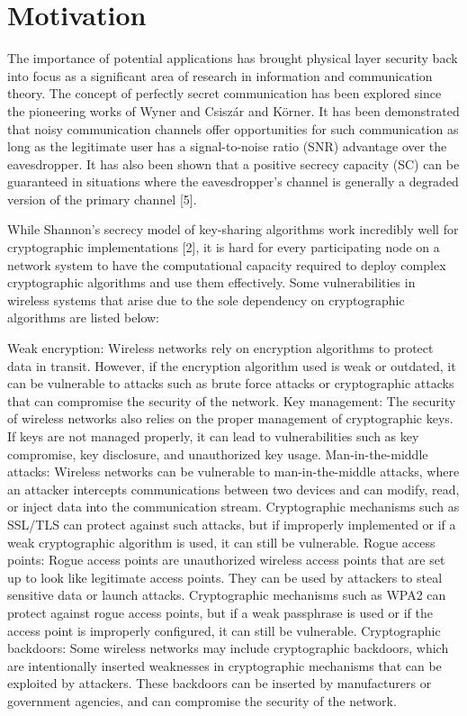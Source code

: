 \documentclass[conference]{IEEEtran}
\begin{document}
\section{Motivation}


The importance of potential applications has brought physical layer security back into focus as a significant area of research in information and communication theory. The concept of perfectly secret communication has been explored since the pioneering works of Wyner and Csiszár and Körner. It has been demonstrated that noisy communication channels offer opportunities for such communication as long as the legitimate user has a signal-to-noise ratio (SNR) advantage over the eavesdropper. It has also been shown that a positive secrecy capacity (SC) can be guaranteed in situations where the eavesdropper's channel is generally a degraded version of the primary channel [5].

While Shannon’s secrecy model of key-sharing algorithms work incredibly well for cryptographic implementations [2], it is hard for every participating node on a network system to have the computational capacity required to deploy complex cryptographic algorithms and use them effectively. Some vulnerabilities in wireless systems that arise due to the sole dependency on cryptographic algorithms are listed below:

Weak encryption: Wireless networks rely on encryption algorithms to protect data in transit. However, if the encryption algorithm used is weak or outdated, it can be vulnerable to attacks such as brute force attacks or cryptographic attacks that can compromise the security of the network.
Key management: The security of wireless networks also relies on the proper management of cryptographic keys. If keys are not managed properly, it can lead to vulnerabilities such as key compromise, key disclosure, and unauthorized key usage.
Man-in-the-middle attacks: Wireless networks can be vulnerable to man-in-the-middle attacks, where an attacker intercepts communications between two devices and can modify, read, or inject data into the communication stream. Cryptographic mechanisms such as SSL/TLS can protect against such attacks, but if improperly implemented or if a weak cryptographic algorithm is used, it can still be vulnerable.
Rogue access points: Rogue access points are unauthorized wireless access points that are set up to look like legitimate access points. They can be used by attackers to steal sensitive data or launch attacks. Cryptographic mechanisms such as WPA2 can protect against rogue access points, but if a weak passphrase is used or if the access point is improperly configured, it can still be vulnerable.
Cryptographic backdoors: Some wireless networks may include cryptographic backdoors, which are intentionally inserted weaknesses in cryptographic mechanisms that can be exploited by attackers. These backdoors can be inserted by manufacturers or government agencies, and can compromise the security of the network.
\end{document}
